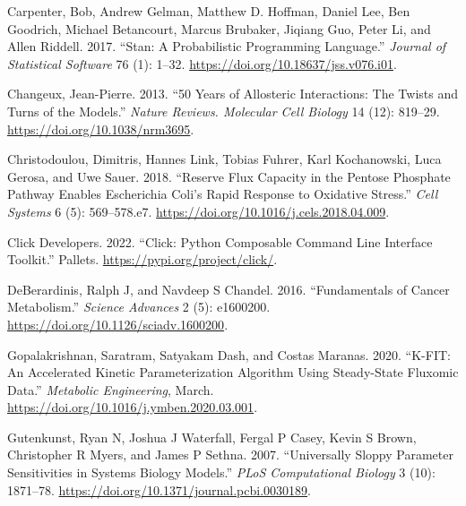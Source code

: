 \documentclass[
  letterpaper,
  DIV=11,
  numbers=noendperiod]{scrartcl}
\newlength{\cslhangindent}
\newlength{\cslentryspacingunit} %
\newenvironment{CSLReferences}[2] %
 {%
  \setlength{\parindent}{0pt}
  \ifodd #1
  \let\oldpar\par
  \def\par{\hangindent=\cslhangindent\oldpar}
  \fi
  \setlength{\parskip}{#2\cslentryspacingunit}
 }%
 {}
\begin{document}
\hypertarget{refs}{}
\begin{CSLReferences}{1}{0}
\leavevmode{}%
Carpenter, Bob, Andrew Gelman, Matthew D. Hoffman, Daniel Lee, Ben
Goodrich, Michael Betancourt, Marcus Brubaker, Jiqiang Guo, Peter Li,
and Allen Riddell. 2017. {``Stan: {A Probabilistic Programming
Language}.''} \emph{Journal of Statistical Software} 76 (1): 1--32.
\url{https://doi.org/10.18637/jss.v076.i01}.

\leavevmode{}%
Changeux, Jean-Pierre. 2013. {``50 Years of Allosteric Interactions: The
Twists and Turns of the Models.''} \emph{Nature Reviews. Molecular Cell
Biology} 14 (12): 819--29. \url{https://doi.org/10.1038/nrm3695}.

\leavevmode{}%
Christodoulou, Dimitris, Hannes Link, Tobias Fuhrer, Karl Kochanowski,
Luca Gerosa, and Uwe Sauer. 2018. {``Reserve {Flux} {Capacity} in the
{Pentose} {Phosphate} {Pathway} {Enables} {Escherichia} Coli's {Rapid}
{Response} to {Oxidative} {Stress}.''} \emph{Cell Systems} 6 (5):
569--578.e7. \url{https://doi.org/10.1016/j.cels.2018.04.009}.

\leavevmode{}%
Click Developers. 2022. {``Click: {Python} Composable Command Line
Interface Toolkit.''} Pallets. \url{https://pypi.org/project/click/}.

\leavevmode{}%
DeBerardinis, Ralph J, and Navdeep S Chandel. 2016. {``Fundamentals of
Cancer Metabolism.''} \emph{Science Advances} 2 (5): e1600200.
\url{https://doi.org/10.1126/sciadv.1600200}.

\leavevmode{}%
Gopalakrishnan, Saratram, Satyakam Dash, and Costas Maranas. 2020.
{``K-{FIT}: {An} Accelerated Kinetic Parameterization Algorithm Using
Steady-State Fluxomic Data.''} \emph{Metabolic Engineering}, March.
\url{https://doi.org/10.1016/j.ymben.2020.03.001}.

\leavevmode{}%
Gutenkunst, Ryan N, Joshua J Waterfall, Fergal P Casey, Kevin S Brown,
Christopher R Myers, and James P Sethna. 2007. {``Universally Sloppy
Parameter Sensitivities in Systems Biology Models.''} \emph{PLoS
Computational Biology} 3 (10): 1871--78.
\url{https://doi.org/10.1371/journal.pcbi.0030189}.


\end{CSLReferences}
\end{document}
